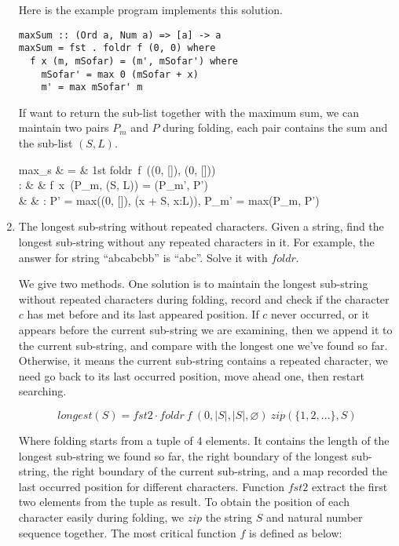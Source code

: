 \documentclass[UTF8]{article}
\begin{document}
\begin{enumerate}
Here is the example program implements this solution.

\lstset{frame=single}
\begin{lstlisting}
maxSum :: (Ord a, Num a) => [a] -> a
maxSum = fst . foldr f (0, 0) where
  f x (m, mSofar) = (m', mSofar') where
    mSofar' = max 0 (mSofar + x)
    m' = max mSofar' m
\end{lstlisting}

If want to return the sub-list together with the maximum sum, we can maintain two pairs $P_m$ and $P$ during folding, each pair contains the sum and the sub-list $(S, L)$.

\blre
max_s & = & 1st \cdot foldr\ f\ ((0, []), (0, [])) \\
: & & f\ x\ (P_m, (S, L)) = (P_m', P') \\
& & :  P' = max((0, []), (x + S, x:L)), P_m' = max(P_m, P') \\
\elre

\item The longest sub-string without repeated characters. Given a string, find the longest sub-string without any repeated characters in it. For example, the answer for string ``abcabcbb'' is ``abc''. Solve it with $foldr$.

We give two methods. One solution is to maintain the longest sub-string without repeated characters during folding, record and check if the character $c$ has met before and its last appeared position. If $c$ never occurred, or it appears before the current sub-string we are examining, then we append it to the current sub-string, and compare with the longest one we've found so far. Otherwise, it means the current sub-string contains a repeated character, we need go back to its last occurred position, move ahead one, then restart searching.

\[
longest(S) = fst2 \cdot foldr\ f\ (0, |S|, |S|, \varnothing)\ zip(\{1, 2, ...\}, S)
\]

Where folding starts from a tuple of 4 elements. It contains the length of the longest sub-string we found so far, the right boundary of the longest sub-string, the right boundary of the current sub-string, and a map recorded the last occurred position for different characters. Function $fst2$ extract the first two elements from the tuple as result. To obtain the position of each character easily during folding, we $zip$ the string $S$ and natural number sequence together. The most critical function $f$ is defined as below:


\end{enumerate}
\end{document}
